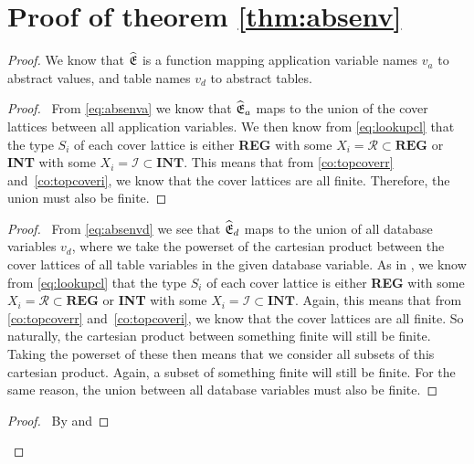 \section{Proof of theorem \ref{thm:absenv}}

\absenv*

\begin{proof}
   We know that $\widehat{\mathfrak{E}}$ is a function mapping application variable names $v_a$ to abstract values, and table names $v_d$ to abstract tables.
    \begin{proof}
        \pf\ From \autoref{eq:absenva} we know that $\widehat{\mathfrak{E}}_a$ maps to the union of the cover lattices between all application variables.
        We then know from \autoref{eq:lookupcl} that the type $S_i$ of each cover lattice is either \textbf{REG} with some $X_i=\mathcal{R}\subset\textbf{REG}$ or \textbf{INT} with some $X_i=\mathcal{I}\subset\textbf{INT}$.
        This means that from \autoref{co:topcoverr} and~\ref{co:topcoveri}, we know that the cover lattices are all finite.
        Therefore, the union must also be finite.
    \end{proof}
    \begin{proof}
        \pf\ From \autoref{eq:absenvd} we see that $\widehat{\mathfrak{E}}_d$ maps to the union of all database variables $v_d$, where we take the powerset of the cartesian product between the cover lattices of all table variables in the given database variable.
        As in , we know from \autoref{eq:lookupcl} that the type $S_i$ of each cover lattice is either \textbf{REG} with some $X_i=\mathcal{R}\subset\textbf{REG}$ or \textbf{INT} with some $X_i=\mathcal{I}\subset\textbf{INT}$.
        Again, this means that from \autoref{co:topcoverr} and~\ref{co:topcoveri}, we know that the cover lattices are all finite.
        So naturally, the cartesian product between something finite will still be finite.
        Taking the powerset of these then means that we consider all subsets of this cartesian product.
        Again, a subset of something finite will still be finite.
        For the same reason, the union between all database variables must also be finite.
    \end{proof}
    \qedstep
    \begin{proof}
        \pf\ By  and 
    \end{proof}
\end{proof}
